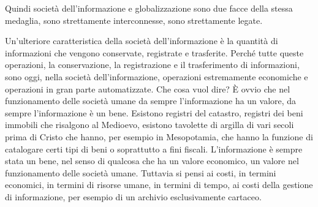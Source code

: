 Quindi società dell'informazione e globalizzazione sono due facce della stessa medaglia, sono strettamente interconnesse, sono strettamente legate.\par
Un'ulteriore caratteristica della società dell'informazione è la quantità di informazioni che vengono conservate, registrate e trasferite. Perché tutte queste operazioni, la conservazione, la registrazione e il trasferimento di informazioni, sono oggi, nella società dell'informazione, operazioni estremamente economiche e operazioni in gran parte automatizzate. Che cosa vuol dire? È ovvio che nel funzionamento delle società umane da sempre l'informazione ha un valore, da sempre l'informazione è un bene. Esistono registri del catastro, registri dei beni immobili che risalgono al Medioevo, esistono tavolette di argilla di vari secoli prima di Cristo che hanno, per esempio in Mesopotamia, che hanno la funzione di catalogare certi tipi di beni o soprattutto a fini fiscali. L'informazione è sempre stata un bene, nel senso di qualcosa che ha un valore economico, un valore nel funzionamento delle società umane. Tuttavia si pensi ai costi, in termini economici, in termini di risorse umane, in termini di tempo, ai costi della gestione di informazione, per esempio di un archivio esclusivamente cartaceo. 

